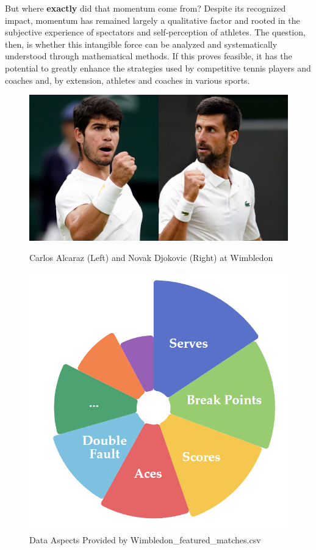 \documentclass[12pt]{article}  %
\begin{document}
But where \textbf{exactly} did that momentum come from? Despite its recognized impact, momentum has remained largely a qualitative factor and rooted in the subjective experience of spectators and self-perception of athletes. The question, then, is whether this intangible force can be analyzed and systematically understood through mathematical methods. If this proves feasible, it has the potential to greatly enhance the strategies used by competitive tennis players and coaches and, by extension, athletes and coaches in various sports.

\begin{figure}[htbp]
	\centering
	\begin{minipage}{0.5\textwidth}
	\centering  %
\includegraphics[width=.95\textwidth]{carlos-alcaraz.jpg} %
\caption{Carlos Alcaraz (Left) and Novak Djokovic (Right) at Wimbledon \cite{1}} %
\label{fig:Fire Situation} %
	\end{minipage}\hfill
	\begin{minipage}{0.45\textwidth}
	\centering  %
\includegraphics[width=.6\textwidth]{data-given.png} %
\caption{Data Aspects Provided by Wimbledon\_featured\_matches.csv} %
\label{fig:Fire Situation} %
	\end{minipage}
\end{figure}
\end{document}

